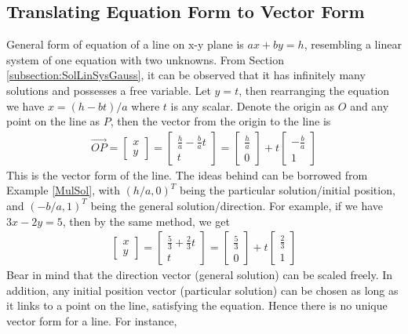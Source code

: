 \subsection{Translating Equation Form to Vector Form}
General form of equation of a line on x-y plane is $ax + by = h$, resembling a linear system of one equation with two unknowns. From Section \ref{subsection:SolLinSysGauss}, it can be observed that it has infinitely many solutions and possesses a free variable. Let $y = t$, then rearranging the equation we have $x = (h - bt)/a$ where $t$ is any scalar. Denote the origin as $O$ and any point on the line as $P$, then the vector from the origin to the line is
\begin{align*}
\overrightarrow{OP} =
\begin{bmatrix}
x \\
y
\end{bmatrix}
=
\begin{bmatrix}
\frac{h}{a} - \frac{b}{a}t\\
t
\end{bmatrix}
= 
\begin{bmatrix}
\frac{h}{a}\\
0
\end{bmatrix}
+ t
\begin{bmatrix}
-\frac{b}{a}\\
1
\end{bmatrix}
\end{align*}
This is the vector form of the line. The ideas behind can be borrowed from Example \ref{MulSol}, with $(h/a, 0)^T$ being the particular solution/initial position, and $(-b/a, 1)^T$ being the general solution/direction. For example, if we have $3x - 2y = 5$, then by the same method, we get
\begin{align*}
\begin{bmatrix}
x \\
y
\end{bmatrix}
=
\begin{bmatrix}
\frac{5}{3} + \frac{2}{3}t\\
t
\end{bmatrix}
= 
\begin{bmatrix}
\frac{5}{3}\\
0
\end{bmatrix}
+ t
\begin{bmatrix}
\frac{2}{3}\\
1
\end{bmatrix}    
\end{align*}
Bear in mind that the direction vector (general solution) can be scaled freely. In addition, any initial position vector (particular solution) can be chosen as long as it links to a point on the line, satisfying the equation. Hence there is no unique vector form for a line. For instance,
